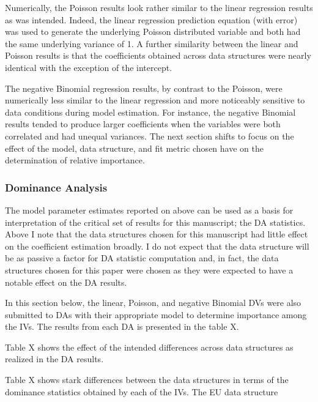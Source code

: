 \documentclass[ShortAfour,times,sageapa]{sagej}
\begin{document}
	Numerically, the Poisson results look rather similar to the linear regression results as was intended.  
	Indeed, the linear regression prediction equation (with error) was used to generate the underlying Poisson distributed variable and both had the same underlying variance of 1.
	A further similarity between the linear and Poisson results is that the coefficients obtained across data structures were nearly identical with the exception of the intercept.
	
	

	The negative Binomial regression results, by contrast to the Poisson, were numerically less similar to the linear regression and more noticeably sensitive to data conditions during model estimation.
	For instance, the negative Binomial results tended to produce larger coefficients when the variables were both correlated and had unequal variances.
	The next section shifts to focus on the effect of the model, data structure, and fit metric chosen have on the determination of relative importance.
	
	\subsubsection{Dominance Analysis}
	
	The model parameter estimates reported on above can be used as a basis for interpretation of the critical set of results for this manuscript; the DA statistics.
	Above I note that the data structures chosen for this manuscript had little effect on the coefficient estimation broadly.
	I do not expect that the data structure will be as passive a factor for DA statistic computation and, in fact, the data structures chosen for this paper were chosen as they were expected to have a notable effect on the DA results.
	
	In this section below, the linear, Poisson, and negative Binomial DVs were also submitted to DAs with their appropriate model to determine importance among the IVs.  
	The results from each DA is presented in the table X.
	
	
	
	
	Table X shows the effect of the intended differences across data structures as realized in the DA results.
	
	Table X shows stark differences between the data structures in terms of the dominance statistics obtained by each of the IVs.  The EU data structure
	
\end{document}
